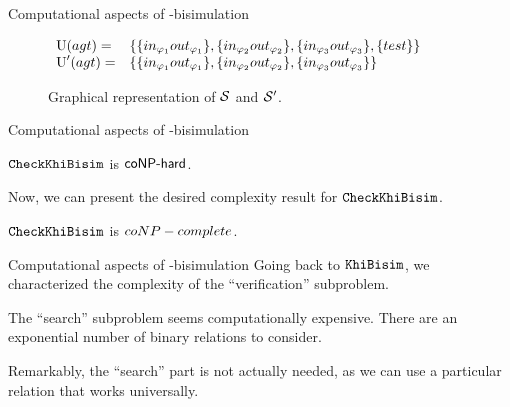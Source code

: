 \documentclass{beamer}
\begin{document}
\begin{frame}{Computational aspects of \KHilogic-bisimulation}
\begin{figure}[t]
\begin{small}
\begin{center}
                    $\begin{array}{ll}
                        \operatorname{U}(agt) = &
                         \left\{\{in_{\varphi_1}out_{\varphi_1}\},
                        \{in_{\varphi_2}out_{\varphi_2}\},
                        \{in_{\varphi_3}out_{\varphi_3}\},
                        \{test\} \right\}\\
                        \operatorname{U}'(agt) = & 
                        \left\{\{in_{\varphi_1}out_{\varphi_1}\},
                        \{in_{\varphi_2}out_{\varphi_2}\},
                        \{in_{\varphi_3}out_{\varphi_3}\} \right\}
                    \end{array}$
    \end{center}
    \caption{Graphical representation of $\mathcal{S}$ and $\mathcal{S}'$.}
    \label{fig:karp-reduction}
    \end{small}
    \end{figure}
\end{frame}


\begin{frame}{Computational aspects of \KHilogic-bisimulation}
    \begin{lemma}
        $\mathtt{CheckKhiBisim}$ is $\rm\textsf{coNP-hard}$.
    \end{lemma}\pause

    \vspace{5mm}

    Now, we can present the desired complexity result for $\mathtt{CheckKhiBisim}$.\pause

    \vspace{5mm}

    \begin{theorem}
        $\mathtt{CheckKhiBisim}$ is ${coNP-complete}$.
    \end{theorem}
\end{frame}


\begin{frame}{Computational aspects of \KHilogic-bisimulation}
    Going back to $\mathtt{KhiBisim}$, we characterized the complexity of the ``verification'' subproblem.\pause

    The ``search'' subproblem seems computationally expensive. There are an exponential number of binary relations to consider. \pause

    Remarkably, the ``search'' part is not actually needed, as we can use a particular relation that works universally. 
\end{frame}
\end{document}
